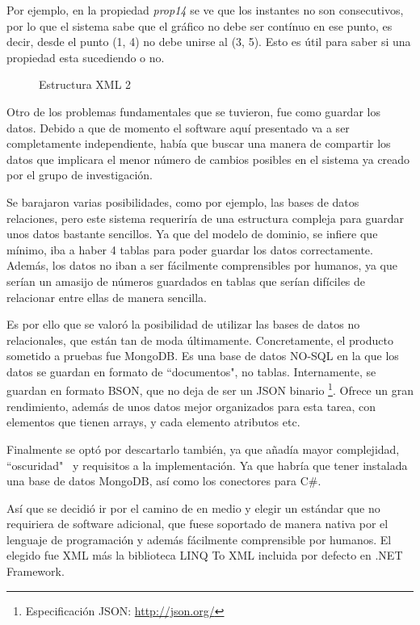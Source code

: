 Por ejemplo, en la propiedad \emph{prop14} se ve que los instantes no son consecutivos, por lo que el sistema sabe que el 
gr\'{a}fico no debe ser cont\'inuo en ese punto, es decir, desde el punto (1, 4) no debe unirse al 
(3, 5). Esto es \'{u}til para saber si una propiedad esta sucediendo o no.

\begin{figure}[h]
    
    \caption[Estructura XML 2]{Estructura XML 2}
    \label{Estructura XML2}
\end{figure}

Otro de los problemas fundamentales que se tuvieron, fue como guardar los datos. Debido a que de momento el software
aqu\'i presentado va a ser completamente independiente, hab\'ia que buscar una manera de compartir los datos
que implicara el menor n\'umero de cambios posibles en el sistema ya creado por el grupo de investigaci\'on.

Se barajaron varias posibilidades, como por ejemplo, las bases de datos relaciones, pero este sistema requerir\'ia
de una estructura compleja para guardar unos datos bastante sencillos. Ya que del modelo de dominio, se infiere que m\'inimo,
iba a haber 4 tablas para poder guardar los datos correctamente. Adem\'as, los datos no iban a ser f\'acilmente 
comprensibles por humanos, ya que ser\'ian un amasijo de n\'umeros guardados en tablas que ser\'ian dif\'iciles de
relacionar entre ellas de manera sencilla.

Es por ello que se valor\'o la posibilidad de utilizar las bases de datos no relacionales, que est\'an tan de moda
\'ultimamente. Concretamente, el producto sometido a pruebas fue MongoDB. Es una base de datos NO-SQL en la que los
datos se guardan en formato de ``documentos", no tablas. Internamente, se guardan en formato BSON, que no deja de ser
un JSON binario \footnote{Especificaci\'{o}n JSON: \url{http://json.org/}}. Ofrece un gran rendimiento, adem\'as
de unos datos mejor organizados para esta tarea, con elementos que tienen arrays, y cada elemento atributos etc.

Finalmente se opt\'o por descartarlo tambi\'en, ya que a\~nad\'ia mayor complejidad, ``oscuridad" \ y requisitos a la 
implementaci\'on. Ya que habr\'ia que tener instalada una base de datos MongoDB, as\'i como los conectores para
C\#.

As\'i que se decidi\'o ir por el camino de en medio y elegir un est\'andar que no requiriera de software adicional,
que fuese soportado de manera nativa por el lenguaje de programaci\'on y adem\'as f\'acilmente comprensible por
humanos. El elegido fue XML m\'as la biblioteca LINQ To XML incluida por defecto en .NET Framework. 

